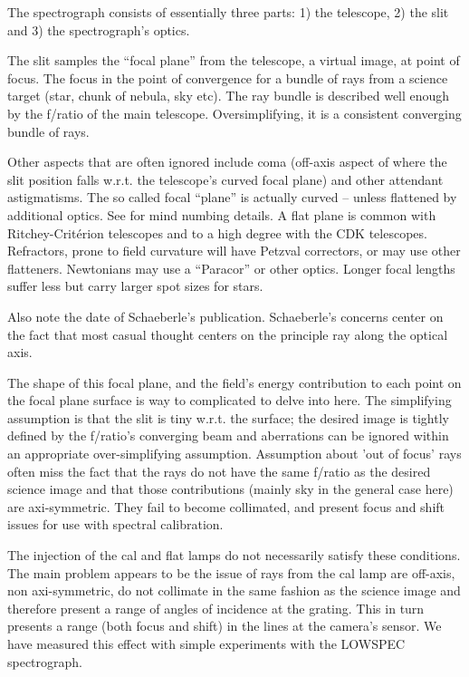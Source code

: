 \documentclass[letter,11pt,oneside]{article}
\begin{document}
The spectrograph consists of essentially three parts: 1) the
telescope,  2) the slit and 3) the spectrograph's optics.

The slit samples the ``focal plane'' from the telescope, a virtual
image, at point of focus.  The focus in the point of convergence for a
bundle of rays from a science target (star, chunk of nebula, sky
etc). The ray bundle is described well enough by the f/ratio of the
main telescope. Oversimplifying, it is a consistent converging bundle
of rays.

Other aspects that are often ignored include coma (off-axis aspect of
where the slit position falls w.r.t.  the telescope's curved focal
plane) and other attendant astigmatisms. The so called focal ``plane''
is actually curved -- unless flattened by additional optics. See
\citep{1898AJ.....19...17S} for mind numbing details. A flat plane is
common with Ritchey-Crit\'erion telescopes and to a high degree with
the CDK telescopes. Refractors, prone to field curvature will have
Petzval correctors, or may use other flatteners. Newtonians may use a
``Paracor'' \texttrademark or other optics. Longer focal lengths
suffer less but carry larger spot sizes for stars.

Also note the date of Schaeberle's publication. Schaeberle's concerns
center on the fact that most casual thought centers on the principle
ray along the optical axis.

The shape of this focal plane, and the field's energy contribution to
each point on the focal plane surface is way to complicated to delve
into here. The simplifying assumption is that the slit is tiny w.r.t.
the surface; the desired image is tightly defined by the f/ratio's
converging beam and aberrations can be ignored within an appropriate
over-simplifying assumption. Assumption about 'out of focus' rays
often miss the fact that the rays do not have the same f/ratio as the
desired science image and that those contributions (mainly sky in the
general case here) are axi-symmetric. They fail to become collimated,
and present focus and shift issues for use with spectral calibration.


The injection of the cal and flat lamps do not necessarily
satisfy these conditions. The main problem appears to be the
issue of rays from the cal lamp are off-axis, non axi-symmetric,
do not collimate in the same fashion as the science image
and therefore present a range of angles of incidence at the
grating. This in turn presents a range (both focus and shift)
in the lines at the camera's sensor. We have measured this
effect with simple experiments with the LOWSPEC spectrograph.
\end{document}
